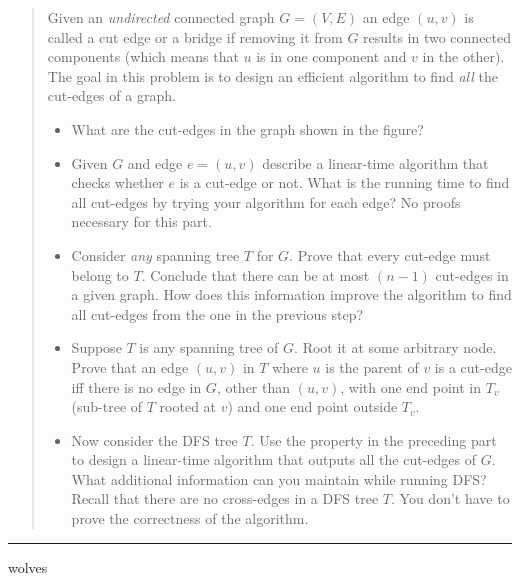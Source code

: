 \documentclass[11pt]{article}
\begin{document}
\begin{quote}
 Given an \emph{undirected} connected graph $G=(V,E)$ an edge $(u,v)$ is
  called a cut edge or a bridge if removing it from $G$ results in
  two connected components (which means that $u$ is in one component
  and $v$ in the other). The goal in this problem is to design an efficient
  algorithm to find {\em all} the cut-edges of a graph.

  \begin{itemize}
  \item What are the cut-edges in the graph shown in the figure?

  \item Given $G$ and edge $e=(u,v)$ describe a linear-time algorithm
    that checks whether $e$ is a cut-edge or not. What is the running time
    to find all cut-edges by trying your algorithm for each edge? No proofs
    necessary for this part.
  \item Consider {\em any} spanning tree $T$ for $G$. Prove that every
    cut-edge must belong to $T$. Conclude that there can be at most $(n-1)$
    cut-edges in a given graph. How does this information improve the
    algorithm to find all cut-edges from the one in the previous step?
  \item Suppose $T$ is any spanning tree of $G$. Root it at some
    arbitrary node.  Prove that an edge $(u,v)$ in $T$ where $u$ is
    the parent of $v$ is a cut-edge iff there is no edge in $G$, other
    than $(u,v)$, with one end point in $T_v$ (sub-tree of $T$ rooted
    at $v$) and one end point outside $T_v$.
  \item Now consider the DFS tree $T$.  Use the property in the
    preceding part to design a linear-time algorithm that outputs all
    the cut-edges of $G$. What additional information can you maintain
    while running DFS? Recall that there are no cross-edges in a DFS
    tree $T$. You don't have to prove the correctness of
    the algorithm.
  \end{itemize}
\end{quote}
\hrule



\begin{solution}
    wolves
\end{solution}
\end{document}
